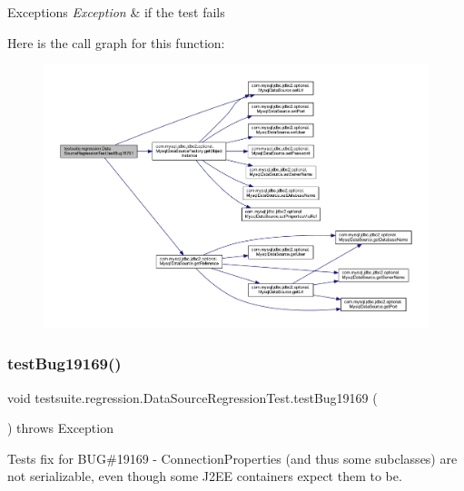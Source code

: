 \begin{DoxyExceptions}{Exceptions}
{\em Exception} & if the test fails \\
\hline
\end{DoxyExceptions}
Here is the call graph for this function\+:
\nopagebreak
\begin{figure}[H]
\begin{center}
\leavevmode
\includegraphics[width=350pt]{classtestsuite_1_1regression_1_1_data_source_regression_test_af69d51f59966174507009b456bcc4ef3_cgraph}
\end{center}
\end{figure}
\mbox{\label{classtestsuite_1_1regression_1_1_data_source_regression_test_a9ef6137b8f62a30be45c74a81be1d299}} 
\subsubsection{\texorpdfstring{test\+Bug19169()}{testBug19169()}}
{\footnotesize\ttfamily void testsuite.\+regression.\+Data\+Source\+Regression\+Test.\+test\+Bug19169 (\begin{DoxyParamCaption}{ }\end{DoxyParamCaption}) throws Exception}

Tests fix for B\+UG\#19169 -\/ Connection\+Properties (and thus some subclasses) are not serializable, even though some J2\+EE containers expect them to be.



